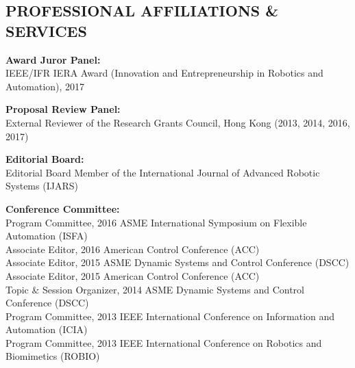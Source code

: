 \documentclass[UTF8,nofonts]{res}
\begin{document}
\begin{resume}
\section{PROFESSIONAL AFFILIATIONS \& SERVICES}
\vspace{0.1in}

    \textbf{Award Juror Panel:}\\
    IEEE/IFR IERA Award (Innovation and Entrepreneurship in Robotics and Automation), 2017
    
    \textbf{Proposal Review Panel:}\\ %
    External Reviewer of the Research Grants Council, Hong Kong (2013, 2014, 2016, 2017)
 	
    \textbf{Editorial Board:}\\ %
    Editorial Board Member of the International Journal of Advanced Robotic Systems (IJARS)

    \textbf{Conference Committee:}\\ %
    Program Committee, 2016 ASME International Symposium on Flexible Automation (ISFA)\\
    Associate Editor, 2016 American Control Conference (ACC)\\
    Associate Editor, 2015 ASME Dynamic Systems and Control Conference (DSCC)\\
    Associate Editor, 2015 American Control Conference (ACC)\\
    Topic \& Session Organizer, 2014 ASME Dynamic Systems and Control Conference (DSCC)\\
    Program Committee, 2013 IEEE International Conference on Information and Automation (ICIA)\\
    Program Committee, 2013 IEEE International Conference on Robotics and Biomimetics (ROBIO)


\end{resume}
\end{document}

